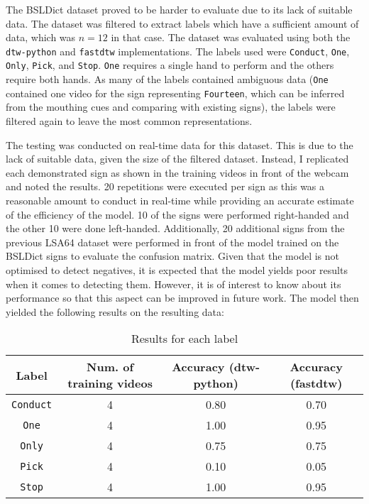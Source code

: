 \documentclass[final,rdr32.tex]{subfiles}
\begin{document}
The BSLDict dataset proved to be harder to evaluate due to its lack of suitable data. The dataset was filtered to extract labels which have a sufficient amount of data, which was $n=12$ in that case. The dataset was evaluated using both the \verb|dtw-python| and \verb|fastdtw| implementations. The labels used were \verb|Conduct|, \verb|One|, \verb|Only|, \verb|Pick|, and \verb|Stop|. \verb|One| requires a single hand to perform and the others require both hands. As many of the labels contained ambiguous data (\verb|One| contained one video for the sign representing \verb|Fourteen|, which can be inferred from the mouthing cues and comparing with existing signs), the labels were filtered again to leave the most common representations.

The testing was conducted on real-time data for this dataset. This is due to the lack of suitable data, given the size of the filtered dataset. Instead, I replicated each demonstrated sign as shown in the training videos in front of the webcam and noted the results. 20 repetitions were executed per sign as this was a reasonable amount to conduct in real-time while providing an accurate estimate of the efficiency of the model. 10 of the signs were performed right-handed and the other 10 were done left-handed. Additionally, 20 additional signs from the previous LSA64 dataset were performed in front of the model trained on the BSLDict signs to evaluate the confusion matrix. Given that the model is not optimised to detect negatives, it is expected that the model yields poor results when it comes to detecting them. However, it is of interest to know about its performance so that this aspect can be improved in future work. The model then yielded the following results on the resulting data:

\begin{table}[H]
    \begin{center}
        \begin{tabular}{ |c|c|c|c| }
            \hline
            Label          & Num. of training videos & Accuracy (dtw-python) & Accuracy (fastdtw) \\
            \hline
            \verb|Conduct| & 4                       & 0.80                  & 0.70               \\
            \verb|One|     & 4                       & 1.00                  & 0.95               \\
            \verb|Only|    & 4                       & 0.75                  & 0.75               \\
            \verb|Pick|    & 4                       & 0.10                  & 0.05               \\
            \verb|Stop|    & 4                       & 1.00                  & 0.95               \\
            \hline
        \end{tabular}
    \end{center}
    \caption{Results for each label}
    \label{tab:bsldictresults}
\end{table}
\end{document}
